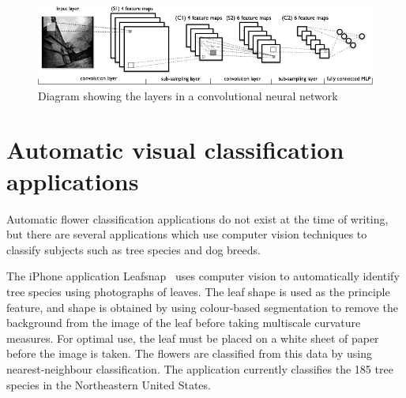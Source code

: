 \documentclass[11pt, a4paper]{report}
\begin{document}
\begin{figure}[hbt]
	\centering
  \includegraphics[totalheight=3cm]{img/52.png}
  \caption{Diagram showing the layers in a convolutional neural network}%
  \label{img:52}
\end{figure}


\section{Automatic visual classification applications}

Automatic flower classification applications do not exist at the time of writing, but there are several applications which use computer vision techniques to classify subjects such as tree species and dog breeds.

The iPhone application Leafsnap~\cite{leafsnap_eccv2012} uses computer vision to automatically identify 	tree species using photographs of leaves. The leaf shape is used as the principle feature, and shape is obtained by using colour-based segmentation to remove the background from the image of the leaf before taking multiscale curvature measures. For optimal use, the leaf must be placed on a white sheet of paper before the image is taken. The flowers are classified from this data by using nearest-neighbour classification. The application currently classifies the 185 tree species in the Northeastern United States. 
\end{document}
